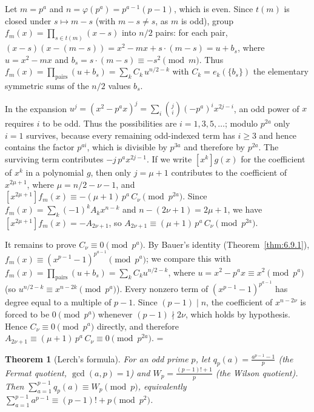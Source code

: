 \documentclass[11pt]{article}
\makeatletter
\theoremstyle{ntstyle}
\newtheorem{theorem}{Theorem}[subsection]
\let\nt@closedisplay\]
\def\nt@guardedclose{\@ifnextchar\par{\nt@closeafterpar}{\@ifnextchar\end{\postdisplaypenalty\@M\nt@closedisplay}{\nt@closedisplay}}}
\def\nt@closeafterpar\par{\@ifnextchar\par{\nt@closeafterpar}{\@ifnextchar\end{\postdisplaypenalty\@M\nt@closedisplay\par}{\nt@closedisplay\par}}}
\renewenvironment{proof}[1][\proofname]{\par
  \pushQED{\qed}\normalfont\topsep\medskipamount\edef\nt@afterproof{\@endparpenalty=\the\@endparpenalty\relax}\@beginparpenalty\@M\@endparpenalty\@M\let\]\nt@guardedclose\trivlist\item[]\textit{#1\@addpunct{.}} \ignorespaces}{\ifvmode\addpenalty\@M\fi\popQED\nt@afterproof\endtrivlist\@endpefalse}
\makeatother
\begin{document}
\begin{proof} Let $m = p^{a}$ and $n = \varphi(p^{a}) =
		p^{a-1}(p-1)$, which is even. Since $t(m)$ is closed under $s \mapsto
		m - s$ (with $m - s \neq s$, as $m$ is odd), group $f_m(x) = \prod_{s \in
			t(m)}(x-s)$ into $n/2$ pairs: for each pair, $(x-s)(x-(m-s)) = x^{2}
		- m x + s\cdot(m-s) = u + b_s$, where $u = x^{2} - m x$ and $b_s = s\cdot(m-s)
		\equiv -s^{2} \pmod{m}$. Thus $f_m(x) = \prod_{\text{pairs}}(u + b_s)
		= \sum_{k} C_k\, u^{n/2 - k}$ with $C_k = e_k(\{b_s\})$ the
	elementary symmetric sums of the $n/2$ values $b_s$.

	In the expansion $u^{j} = (x^{2} - p^{a} x)^{j} = \sum_{i}
		\binom{j}{i}(-p^{a})^{i} x^{2j - i}$, an odd power of $x$ requires $i$ to be odd. Thus the
		possibilities are $i=1,3,5,\ldots$; modulo $p^{2a}$ only $i=1$ survives, because every remaining
		odd-indexed term has $i\ge3$ and hence contains the factor $p^{ai}$, which is divisible by
		$p^{3a}$ and therefore by $p^{2a}$. The surviving term contributes $-j\,p^{a} x^{2j-1}$. If we
		write
	$[x^{k}] g(x)$ for the coefficient of $x^{k}$ in a polynomial $g$, then only
	$j = \mu+1$ contributes to the coefficient of $x^{2\mu+1}$, where $\mu = n/2 - \nu - 1$, and
	$[x^{2\mu+1}] f_m(x) \equiv -(\mu+1)\,p^{a}\, C_{\nu}
		\pmod{p^{2a}}$. Since $f_m(x) = \sum_k (-1)^{k} A_k x^{n-k}$ and $n -
		(2\nu+1) = 2\mu+1$, we have $[x^{2\mu+1}] f_m(x) = -A_{2\nu+1}$, so
	$A_{2\nu+1} \equiv (\mu+1)\,p^{a}\, C_{\nu} \pmod{p^{2a}}$.

	It remains to prove $C_{\nu} \equiv 0 \pmod{p^{a}}$. By Bauer's identity
	(Theorem~\ref{thm:6.9.1}), $f_m(x) \equiv (x^{p-1}-1)^{p^{a-1}} \pmod{p^{a}}$;
	we compare this with $f_m(x) = \prod_{\text{pairs}}(u+b_s) = \sum_k C_k
		u^{n/2-k}$, where $u = x^2 - p^a x \equiv x^2 \pmod{p^a}$ (so
	$u^{n/2-k} \equiv x^{n-2k} \pmod{p^a}$). Every nonzero term of
	$(x^{p-1}-1)^{p^{a-1}}$ has degree equal to a multiple of $p-1$. Since
	$(p-1)\mid n$, the coefficient of $x^{n-2\nu}$ is forced to be $0
		\pmod{p^a}$ whenever $(p-1) \nmid 2\nu$, which holds by hypothesis.
	Hence $C_{\nu} \equiv 0 \pmod{p^{a}}$ directly, and therefore
	$A_{2\nu+1} \equiv (\mu+1)\,p^{a}\,C_{\nu} \equiv 0 \pmod{p^{2a}}$.
\end{proof}
\begin{theorem}[Lerch's formula]\label{thm:6.9.3} For an odd prime
	$p$, let $q_p(a) = \tfrac{a^{p-1}-1}{p}$ (the Fermat quotient,
	$\gcd(a, p)=1$) and $W_p = \tfrac{(p-1)!+1}{p}$ (the Wilson quotient).
	Then $\sum_{a=1}^{p-1} q_p(a) \equiv W_p \pmod{p}$, equivalently
	$\sum_{a=1}^{p-1} a^{p-1} \equiv (p-1)! + p \pmod{p^{2}}$.
\end{theorem}
\end{document}
